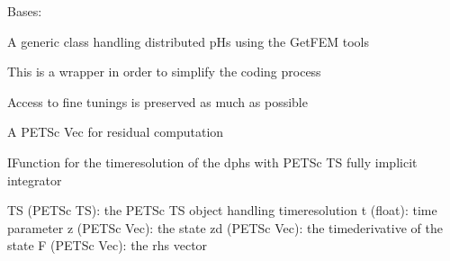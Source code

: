\documentclass[letterpaper,10pt,english]{sphinxmanual}
\begin{document}
\begin{fulllineitems}
\label{\detokenize{scrimp:scrimp.dphs.DPHS}}
\pysigstartsignatures
\pysiglinewithargsret
{}
{}
{}
\pysigstopsignatures
\sphinxAtStartPar
Bases: 

\sphinxAtStartPar
A generic class handling distributed pHs using the GetFEM tools

\sphinxAtStartPar
This is a wrapper in order to simplify the coding process

\sphinxAtStartPar
Access to fine tunings is preserved as much as possible

\begin{fulllineitems}
\label{\detokenize{scrimp:scrimp.dphs.DPHS.F}}
\pysigstartsignatures
\pysigline
{}
\pysigstopsignatures
\sphinxAtStartPar
A PETSc Vec for residual computation

\end{fulllineitems}


\begin{fulllineitems}
\label{\detokenize{scrimp:scrimp.dphs.DPHS.IFunction}}
\pysigstartsignatures
\pysiglinewithargsret
{}
{\sphinxparamcomma {}\sphinxparamcomma {}\sphinxparamcomma {}\sphinxparamcomma {}}
{}
\pysigstopsignatures
\sphinxAtStartPar
IFunction for the time\sphinxhyphen{}resolution of the dphs with PETSc TS fully implicit integrator
\begin{description}
\sphinxAtStartPar
TS (PETSc TS): the PETSc TS object handling time\sphinxhyphen{}resolution
t (float): time parameter
z (PETSc Vec): the state
zd (PETSc Vec): the time\sphinxhyphen{}derivative of the state
F (PETSc Vec): the rhs vector

\end{description}

\end{fulllineitems}


\end{fulllineitems}
\end{document}
